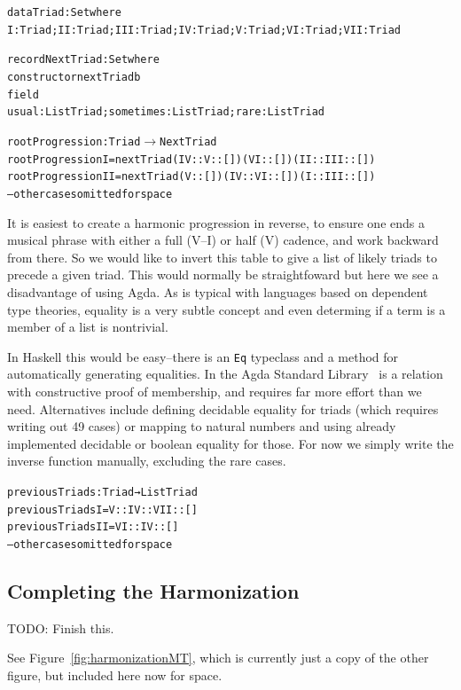 \begin{alltt}
data Triad : Set where
  I : Triad; II : Triad; III : Triad; IV : Triad; V : Triad; VI : Triad; VII : Triad

record NextTriad : Set where
  constructor nextTriadb
  field
    usual : List Triad; sometimes : List Triad; rare : List Triad

rootProgression : Triad \(\rightarrow\) NextTriad
rootProgression I   = nextTriad (IV :: V :: []) (VI :: []) (II :: III :: [])
rootProgression II  = nextTriad (V :: []) (IV  :: VI :: []) (I :: III :: [])
-- other cases omitted for space
\end{alltt}

It is easiest to create a harmonic progression in reverse, to
ensure one ends a musical phrase with either a full (V--I) or half (V)
cadence, and work backward from there. So we would like to invert this
table to give a list of likely triads to precede a given triad. This
would normally be straightfoward but here we see a disadvantage of
using Agda. As is typical with languages based on dependent type
theories, equality is a very subtle concept and even determing if a
term is a member of a list is nontrivial.

In Haskell this would be easy--there is an \texttt{Eq} typeclass and a
method for automatically generating equalities. In the Agda Standard
Library~\citep{agda-stdlib} is a relation with constructive proof of
membership, and requires far more effort than we need. Alternatives
include defining decidable equality for triads (which requires writing
out 49 cases) or mapping to natural numbers and using already
implemented decidable or boolean equality for those. For now we simply
write the inverse function manually, excluding the rare cases.

\begin{alltt}
previousTriads : Triad → List Triad
previousTriads I   = V :: IV :: VII :: []
previousTriads II  = VI :: IV :: []
-- other cases omitted for space
\end{alltt}

\subsection{Completing the Harmonization}
\label{sec:harmony:complete}

TODO: Finish this.

See Figure~\ref{fig:harmonizationMT}, which is currently just a copy of
the other figure, but included here now for space.

